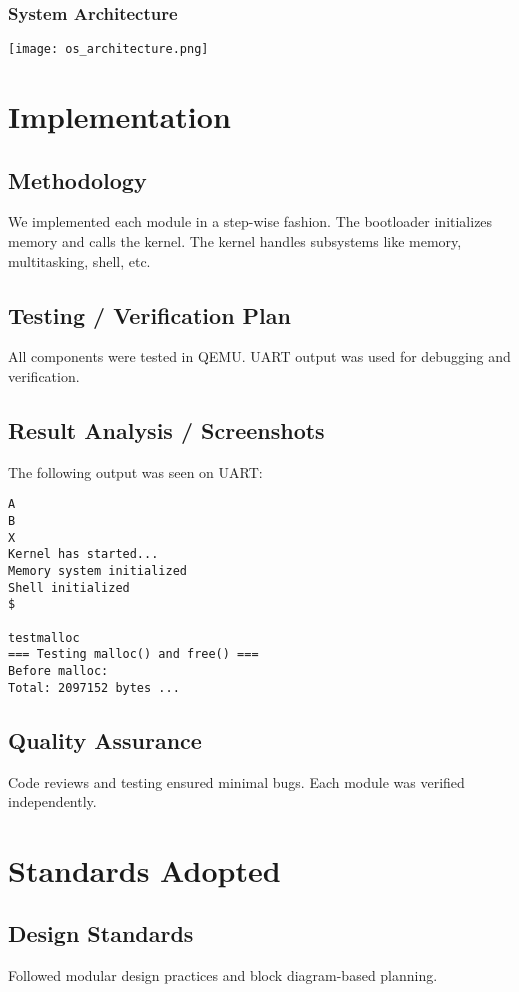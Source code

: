 \documentclass[a4paper,12pt]{report}
\begin{document}
\subsection{System Architecture}
\texttt{[image: os\_architecture.png]} %

\chapter{Implementation}
\section{Methodology}
We implemented each module in a step-wise fashion. The bootloader initializes memory and calls the kernel. The kernel handles subsystems like memory, multitasking, shell, etc.

\section{Testing / Verification Plan}
All components were tested in QEMU. UART output was used for debugging and verification. 

\section{Result Analysis / Screenshots}
The following output was seen on UART:
\begin{verbatim}
A
B
X
Kernel has started...
Memory system initialized
Shell initialized
$ 

testmalloc
=== Testing malloc() and free() ===
Before malloc:
Total: 2097152 bytes ...
\end{verbatim}

\section{Quality Assurance}
Code reviews and testing ensured minimal bugs. Each module was verified independently.

\chapter{Standards Adopted}
\section{Design Standards}
Followed modular design practices and block diagram-based planning.
\end{document}
